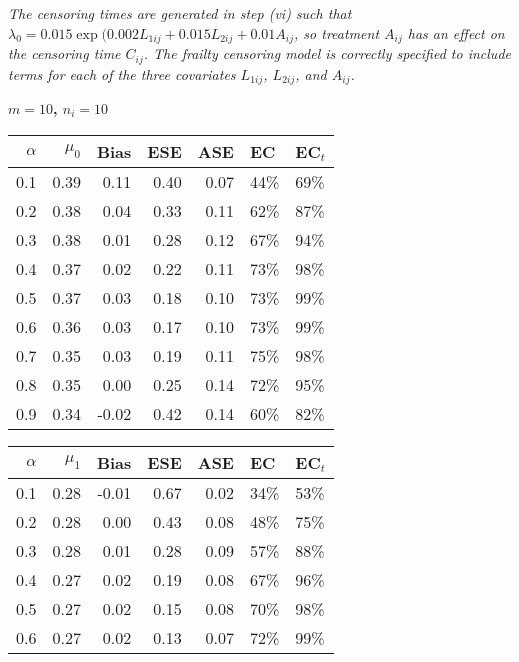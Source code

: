 \documentclass[12pt, letterpaper]{article}
\begin{document}
\begin{table}[ht!]
{\textit{The censoring times are generated in step (vi) such that $\lambda_0=0.015\exp(0.002L_{1ij}+0.015L_{2ij}+0.01A_{ij}$, so treatment $A_{ij}$ has an effect on the censoring time $C_{ij}$. The frailty censoring model is correctly specified to include terms for each of the three covariates $L_{1ij}$, $L_{2ij}$, and $A_{ij}$.}}
\end{table}

\clearpage 



\begin{center}
\textbf{$m=10$, $n_i=10$} 
\end{center}
\begin{table}[ht!]
\centering
\bgroup
\def\arraystretch{1.25}
\setlength\tabcolsep{0.05in}
\begin{tabular}{rrrrrll}
  \hline
$\alpha$ & $\mu_0$ & Bias & ESE & ASE & EC & EC$_t$ \\ 
  \hline
0.1 & 0.39 & 0.11 & 0.40 & 0.07 & 44\% & 69\% \\ 
  0.2 & 0.38 & 0.04 & 0.33 & 0.11 & 62\% & 87\% \\ 
  0.3 & 0.38 & 0.01 & 0.28 & 0.12 & 67\% & 94\% \\ 
  0.4 & 0.37 & 0.02 & 0.22 & 0.11 & 73\% & 98\% \\ 
  0.5 & 0.37 & 0.03 & 0.18 & 0.10 & 73\% & 99\% \\ 
  0.6 & 0.36 & 0.03 & 0.17 & 0.10 & 73\% & 99\% \\ 
  0.7 & 0.35 & 0.03 & 0.19 & 0.11 & 75\% & 98\% \\ 
  0.8 & 0.35 & 0.00 & 0.25 & 0.14 & 72\% & 95\% \\ 
  0.9 & 0.34 & -0.02 & 0.42 & 0.14 & 60\% & 82\% \\     \hline
\end{tabular}
\egroup
\quad 
\bgroup
\setlength\tabcolsep{0.05in}
\def\arraystretch{1.25}
\begin{tabular}{rrrrrll}
  \hline
$\alpha$ & $\mu_1$ & Bias & ESE & ASE & EC & EC$_t$ \\ 
  \hline
0.1 & 0.28 & -0.01 & 0.67 & 0.02 & 34\% & 53\% \\ 
  0.2 & 0.28 & 0.00 & 0.43 & 0.08 & 48\% & 75\% \\ 
  0.3 & 0.28 & 0.01 & 0.28 & 0.09 & 57\% & 88\% \\ 
  0.4 & 0.27 & 0.02 & 0.19 & 0.08 & 67\% & 96\% \\ 
  0.5 & 0.27 & 0.02 & 0.15 & 0.08 & 70\% & 98\% \\ 
  0.6 & 0.27 & 0.02 & 0.13 & 0.07 & 72\% & 99\% \\ 

\end{tabular}
\end{table}
\end{document}
